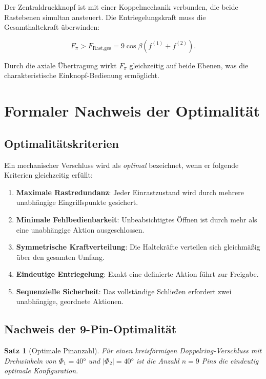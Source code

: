 ﻿\documentclass[12pt, a4paper]{article}
\newtheorem{theorem}{Satz}[section]
\theoremstyle{remark}
\begin{document}
Der Zentraldruckknopf ist mit einer Koppelmechanik verbunden, die beide Rastebenen
simultan ansteuert. Die Entriegelungskraft muss die Gesamthaltekraft überwinden:

\begin{equation}
  F_\pi > F_{\text{Rast,ges}} = 9\cos\beta\left(f^{(1)} + f^{(2)}\right).
\end{equation}

Durch die axiale Übertragung wirkt $F_\pi$ gleichzeitig auf beide Ebenen, was die
charakteristische Einknopf-Bedienung ermöglicht.

\section{Formaler Nachweis der Optimalität}

\subsection{Optimalitätskriterien}

Ein mechanischer Verschluss wird als \emph{optimal} bezeichnet, wenn er folgende Kriterien
gleichzeitig erfüllt:

\begin{enumerate}[label=\textbf{K\arabic*}]
  \item \textbf{Maximale Rastredundanz}: Jeder Einrastzustand wird durch mehrere unabhängige
        Eingriffspunkte gesichert.
  \item \textbf{Minimale Fehlbedienbarkeit}: Unbeabsichtigtes Öffnen ist durch mehr als eine
        unabhängige Aktion ausgeschlossen.
  \item \textbf{Symmetrische Kraftverteilung}: Die Haltekräfte verteilen sich gleichmäßig über
        den gesamten Umfang.
  \item \textbf{Eindeutige Entriegelung}: Exakt eine definierte Aktion führt zur Freigabe.
  \item \textbf{Sequenzielle Sicherheit}: Das vollständige Schließen erfordert zwei unabhängige,
        geordnete Aktionen.
\end{enumerate}

\subsection{Nachweis der 9-Pin-Optimalität}

\begin{theorem}[Optimale Pinanzahl]
  \label{thm:pinoptimal}
  Für einen kreisförmigen Doppelring-Verschluss mit Drehwinkeln von $\Phi_1 = 40 °$ und
  $|\Phi_2| = 40 °$ ist die Anzahl $n = 9$ Pins die eindeutig optimale Konfiguration.
\end{theorem}
\end{document}

